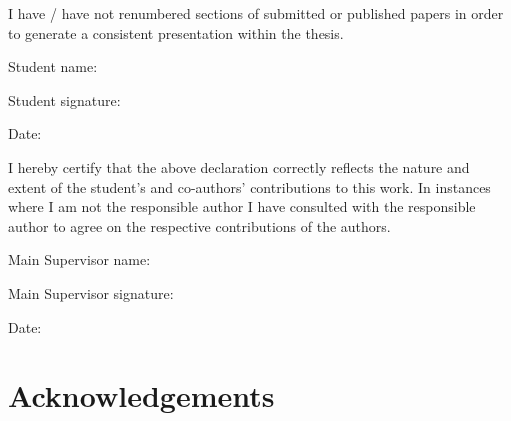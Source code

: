 \documentclass[
  11pt,
  a4paper,
  nottoc]{report}
\begin{document}
\endgroup{}

I have / have not renumbered sections of submitted or published papers
in order to generate a consistent presentation within the thesis.

Student name:

Student signature:

Date:

I hereby certify that the above declaration correctly reflects the
nature and extent of the student's and co-authors' contributions to this
work. In instances where I am not the responsible author I have
consulted with the responsible author to agree on the respective
contributions of the authors.

Main Supervisor name:

Main Supervisor signature:

Date:


\chapter*{Acknowledgements}\label{acknowledgements}

\end{document}
